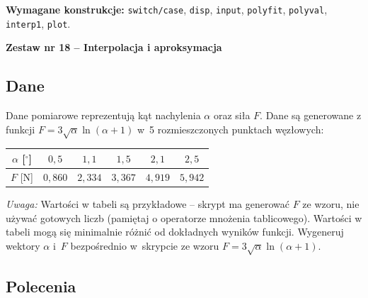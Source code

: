 \documentclass[a4paper,11pt]{article}
\begin{document}
\vspace{0.3cm}
\begin{ramka}
\textbf{Wymagane konstrukcje:}
\texttt{switch/case}, \texttt{disp}, \texttt{input}, \texttt{polyfit}, \texttt{polyval}, \texttt{interp1}, \texttt{plot}.
\end{ramka}

\clearpage
\begin{center}
  {\large\bfseries Zestaw nr 18 \quad -- \quad Interpolacja i aproksymacja}
\end{center}
\hrulefill
\vspace{0.4cm}

\subsection*{Dane}

Dane pomiarowe reprezentują kąt nachylenia $\alpha$ oraz siła $F$.
Dane są generowane z funkcji $F = 3\sqrt{\alpha}\ln(\alpha+1)$ w~5 rozmieszczonych punktach węzłowych:

\begin{center}
\begin{tabular}{c|ccccc}
  \toprule
  $\alpha$ [$^\circ$] & $0{,}5$ & $1{,}1$ & $1{,}5$ & $2{,}1$ & $2{,}5$ \\
  \midrule
  $F$ [$\text{N}$] & $0{,}860$ & $2{,}334$ & $3{,}367$ & $4{,}919$ & $5{,}942$ \\
  \bottomrule
\end{tabular}
\end{center}

\medskip
\textit{Uwaga:} Wartości w tabeli są przykładowe – skrypt ma generować $F$ ze wzoru, nie używać gotowych liczb (pamiętaj o operatorze mnożenia tablicowego). Wartości w tabeli mogą się minimalnie różnić od dokładnych wyników funkcji.
Wygeneruj wektory $\alpha$ i~$F$ bezpośrednio w~skrypcie ze wzoru $F = 3\sqrt{\alpha}\ln(\alpha+1)$.

\subsection*{Polecenia}
\end{document}
